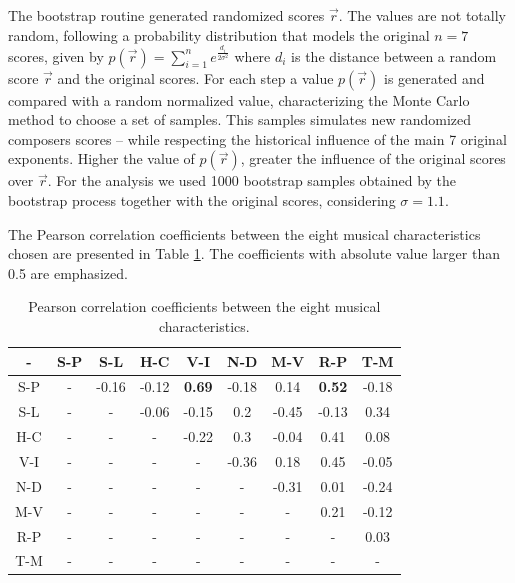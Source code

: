 \documentclass[
 aip,
 jmp,
 amsmath,amssymb,
 reprint,
]{revtex4-1}
\begin{document}
The bootstrap routine generated randomized scores $\vec{r}$. The
values are not totally random, following a probability distribution
that models the original $n = 7$ scores, given by 
$p(\vec{r}) = \sum^n_{i=1} e^{\frac{d_i}{2\sigma^2}}$
where $d_i$ is the distance between a random score $\vec{r}$
and the original scores. For each step a
value $p(\vec{r})$ is generated and compared with a random normalized value,
characterizing the Monte Carlo~\cite{Robert2011} method to choose a set of samples. This
samples simulates new randomized composers scores -- while respecting the
historical influence of the main 7 original exponents. Higher the
value of $p(\vec{r})$, greater the influence of the original scores
over $\vec{r}$. For the analysis
we used 1000 bootstrap samples obtained by the bootstrap process
together with the original scores,
considering $\sigma = 1.1$.

The Pearson correlation coefficients between the eight musical
characteristics chosen are presented in Table \ref{tab:tableB}.
The coefficients with absolute value larger than 0.5 are emphasized.

\begin{table}[ht]
\caption{\label{tab:tableB}Pearson correlation coefficients between
  the eight musical characteristics.}

\begin{ruledtabular}
\begin{tabular}{|c||c|c|c|c|c|c|c|c|}

-   &  S-P  &  S-L   &  H-C   &  V-I            &  N-D  &  M-V    &  R-P           &  T-M  \\ \hline
S-P & -     &  -0.16 &  -0.12 &  \textbf{0.69}  & -0.18 &  0.14   &  \textbf{0.52} &  -0.18 \\
S-L & -     &  -     &  -0.06 &  -0.15          &  0.2  &  -0.45  &  -0.13         &  0.34 \\
H-C & -     &  -     &  -     &  -0.22          &  0.3  &  -0.04  &  0.41          &  0.08 \\
V-I & -     &  -     &  -     &  -              & -0.36 &  0.18   &  0.45          &  -0.05 \\
N-D & -     &  -     &  -     &  -              &  -    &  -0.31  &  0.01          &  -0.24 \\
M-V & -     &  -     &  -     &  -              &  -    &  -      &  0.21          &  -0.12 \\
R-P & -     &  -     &  -     &  -              &  -    &  -      &  -             &  0.03 \\
T-M & -     &  -     &  -     &  -              &  -    &  -      &  -             &  - \\

\end{tabular}
\end{ruledtabular}
\end{table}
\end{document}
